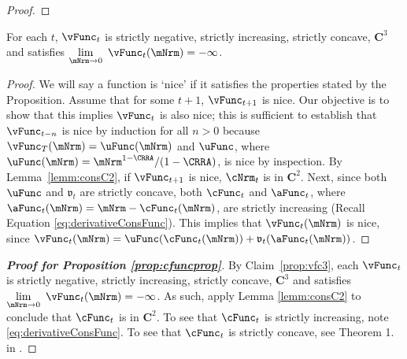 \documentclass[\econtexRoot/BufferStockTheory]{subfiles}
\begin{document}
\begin{proof}
\end{proof}

\begin{claim}\label{prop:vfc3}
For each $t$, $\vFunc_{t}$ is strictly negative, strictly increasing, strictly concave, $\mathbf{C}^{3}$ and satisfies $\lim\limits_{\mNrm\rightarrow 0}~\vFunc_{t}(\mNrm) =-\infty $.
\end{claim}

\begin{proof}
%
We will say a function is `nice' if it satisfies the properties stated by the Proposition.
Assume that for some $t+1$, $\vFunc_{t+1}$ is nice.
Our objective is to show that this
implies $\vFunc_{t}$ is also nice; this is sufficient to establish that
$\vFunc_{t-n}$ is nice by induction for all $n > 0$ because $\vFunc_{T}(\mNrm)
=\uFunc(\mNrm) $ and $\uFunc$, where $\uFunc(\mNrm)=\mNrm^{1-\CRRA}/(1-\CRRA)$, is nice by inspection.
By Lemma~\ref{lemm:consC2}, if $\vFunc_{t+1}$ is nice, $\cNrm_{t}$ is in $\mathbf{C}^{2}$.
Next, since both $\uFunc$ and $\mathfrak{v}_{t}$ are strictly concave, both
$\cFunc_{t}$ and $\aFunc_{t}$, where $\aFunc_{t}(\mNrm)=\mNrm-\cFunc_{t}(\mNrm)$,
are strictly increasing (Recall Equation \eqref{eq:derivativeConsFunc}).
This implies that
$\vFunc_{t}(\mNrm)$ is nice, since
$\vFunc_{t}(\mNrm)=\uFunc(\cFunc_{t}(\mNrm))+\mathfrak{v}_{t}({\aFunc}_{t}(\mNrm))$.
\end{proof}

 
\hypertarget{cFunc-is-Twice-Continuously-Differentiable}{}
\begin{proof}[\textbf{\textit{Proof for Proposition \ref{prop:cfuncprop}}}]

By Claim~\ref{prop:vfc3}, each $\vFunc_{t}$ is strictly negative, strictly increasing, strictly concave, $\mathbf{C}^{3}$ and satisfies $\lim\limits_{\mNrm\rightarrow 0}~\vFunc_{t}(\mNrm) =-\infty $.
As such, apply Lemma \ref{lemm:consC2} to conclude that $\cFunc_{t}$ is in $\mathbf{C}^{2}$.
To see that  $\cFunc_{t}$ is strictly increasing, note \eqref{eq:derivativeConsFunc}.
To see that $\cFunc_{t}$  is strictly concave, see Theorem 1.
in \cite{ckConcavity}.
\end{proof}
\end{document}

